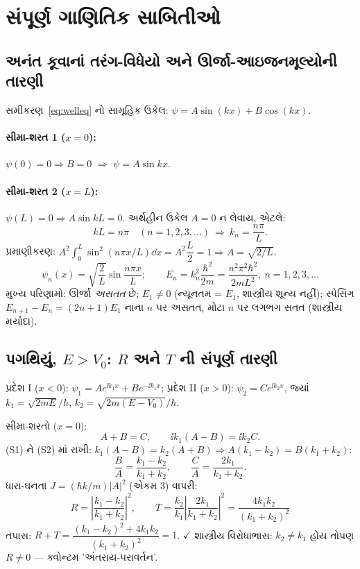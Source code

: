 \section{સંપૂર્ણ ગાણિતિક સાબિતીઓ}

\subsection{અનંત કૂવાનાં તરંગ-વિધેયો અને ઊર્જા-આઇજનમૂલ્યોની તારણી}
સમીકરણ~\eqref{eq:welleq} નો સામૂહિક ઉકેલ: $\psi=A\sin(kx)+B\cos(kx)$.
\paragraph{સીમા-શરત 1 ($x=0$):} $\psi(0)=0\Rightarrow B=0$ $\Rightarrow$ $\psi=A\sin kx$.
\paragraph{સીમા-શરત 2 ($x=L$):} $\psi(L)=0\Rightarrow A\sin kL=0$. અર્થહીન ઉકેલ $A=0$ ન લેવાય, એટલે:
\[
kL=n\pi\quad(n=1,2,3,\dots)\ \Rightarrow\ k_n=\frac{n\pi}{L}.
\]
પ્રમાણીકરણ: $A^{2}\int_0^{L}\sin^{2}(n\pi x/L)\dd x=A^{2}\dfrac L2=1\Rightarrow A=\sqrt{2/L}$.
\begin{equation}
\boxed{\;\psi_n(x)=\sqrt{\frac{2}{L}}\sin\frac{n\pi x}{L};\qquad
E_n=k_n^{2}\frac{\hbar^{2}}{2m}=\frac{n^{2}\pi^{2}\hbar^{2}}{2mL^{2}},\ n=1,2,3,\dots\;}
\end{equation}
મુખ્ય પરિણામો: ઊર્જા \emph{અસતત} છે; $E_1\neq0$ (ન્યૂનતમ = $E_1$, શાસ્ત્રીય શૂન્ય નહીં); સ્પેસિંગ $E_{n+1}-E_n=(2n+1)E_1$ નાના $n$ પર અસતત, મોટા $n$ પર લગભગ સતત (શાસ્ત્રીય મર્યાદા).

\subsection{પગથિયું, $E>V_0$: $R$ અને $T$ ની સંપૂર્ણ તારણી}
પ્રદેશ I ($x<0$): $\psi_1=Ae^{\ii k_1x}+Be^{-\ii k_1x}$; પ્રદેશ II ($x>0$): $\psi_2=Ce^{\ii k_2x}$,
જ્યાં $k_1=\sqrt{2mE}/\hbar$, $k_2=\sqrt{2m(E-V_0)}/\hbar$.

સીમા-શરતો ($x=0$):
\begin{equation}
A+B=C,\qquad \ii k_1(A-B)=\ii k_2C . \tag{S1,S2}
\end{equation}
(S1) ને (S2) માં રાખી: $k_1(A-B)=k_2(A+B)\Rightarrow A(k_1-k_2)=B(k_1+k_2)$:
\[
\frac{B}{A}=\frac{k_1-k_2}{k_1+k_2},\qquad
\frac{C}{A}=\frac{2k_1}{k_1+k_2}.
\]
ધારા-ઘનતા $J=(\hbar k/m)|A|^{2}$ (એકમ 3) વાપરી:
\begin{equation}
\boxed{\;R=\left|\frac{k_1-k_2}{k_1+k_2}\right|^{2},
\qquad
T=\frac{k_2}{k_1}\left|\frac{2k_1}{k_1+k_2}\right|^{2}=\frac{4k_1k_2}{(k_1+k_2)^{2}}\;}
\end{equation}
તપાસ: $R+T=\dfrac{(k_1-k_2)^{2}+4k_1k_2}{(k_1+k_2)^{2}}=1$. $\checkmark$
શાસ્ત્રીય વિરોધાભાસ: $k_2\neq k_1$ હોય તોપણ $R\neq0$ — ક્વોન્ટમ 'અંતરાય-પરાવર્તન'.

